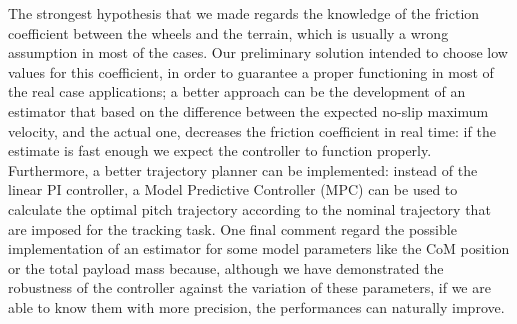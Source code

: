 The strongest hypothesis that we made regards the knowledge of the friction coefficient between the wheels and the terrain, which is usually a wrong assumption in most of the cases.
Our preliminary solution intended to choose low values for this coefficient, in order to guarantee a proper functioning in most of the real case applications; a better approach can be the development of an estimator that based on the difference between the expected no-slip maximum velocity, and the actual one, decreases the friction coefficient in real time: if the estimate is fast enough we expect the controller to function properly.
Furthermore, a better trajectory planner can be implemented: instead of the linear PI controller, a Model Predictive Controller (MPC) can be used to calculate the optimal pitch trajectory according to the nominal trajectory that are imposed for the tracking task.
One final comment regard the possible implementation of an estimator for some model parameters like the CoM position or the total payload mass because, although we have demonstrated the robustness of the controller against the variation of these parameters, if we are able to know them with more precision, the performances can naturally improve.



